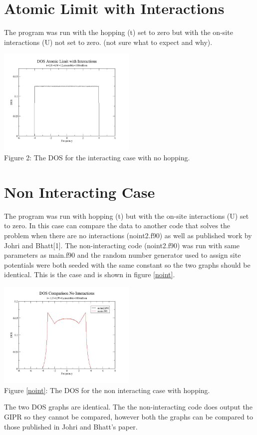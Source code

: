 \documentclass{article}
\begin{document}
\section{Atomic Limit with Interactions}
The program was run with the hopping (t) set to zero but with the on-site interactions (U) not set to zero. (not sure what to expect and why).

\begin{center}
	\includegraphics[width=250px]{dos2_t0u4w12.jpg} \\
	Figure 2: The DOS for the interacting case with no hopping.
\end{center}

\section{Non Interacting Case}
The program was run with hopping (t) but with the on-site interactions (U) set to zero. In this case can compare the data to another code that solves the problem when there are no interactions (noint2.f90) as well as published work by Johri and Bhatt[1]. The non-interacting code (noint2.f90) was run with same parameters as main.f90 and the random number generator used to assign site potentials were both seeded with the same constant so the two graphs should be identical. This is the case and is shown in figure \ref{noint}.
\begin{center} 
	\includegraphics[width=250px]{dos_compareu0.jpg} \\ \label{noint}
	Figure \ref{noint}: The DOS for the non interacting case with hopping.
\end{center}
The two DOS graphs are identical. The the non-interacting code does output the GIPR so they cannot be compared, however both the graphs can be compared to those published in Johri and Bhatt's paper. 
\end{document}
